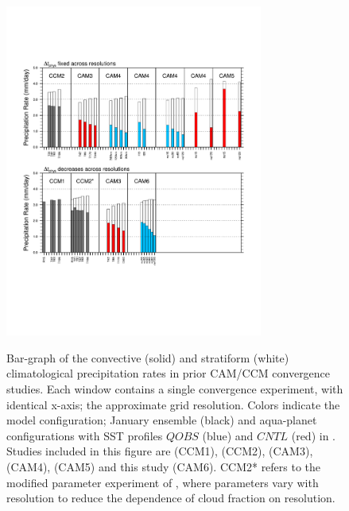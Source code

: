 \documentclass[times]{qjrms4}
\begin{document}
\begin{figure}[t]
\begin{center}
\noindent\includegraphics[width=20pc,angle=0]{figs/cam-history.pdf}\\
\end{center}
\caption{Bar-graph of the convective (solid) and stratiform (white) climatological precipitation rates in prior CAM/CCM convergence studies. Each window contains a single convergence experiment, with identical x-axis; the approximate grid resolution. Colors indicate the model configuration; January ensemble (black) and aqua-planet configurations with SST profiles $QOBS$ (blue) and $CNTL$ (red) in \cite{NH2000ASL}. Studies included in this figure are \cite{KW1991JGR} (CCM1), \cite{WETAL1995CD} (CCM2), \cite{W2008TELLUS} (CAM3), \cite{RETAL2013JCLIM,ZetAl2014JCb,HR2017JCLIM} (CAM4), \cite{ZetAl2014JCb} (CAM5) and this study (CAM6). CCM2* refers to the modified parameter experiment of \cite{WETAL1995CD}, where parameters vary with resolution to reduce the dependence of cloud fraction on resolution.}
\label{fig:cam-history}
\end{figure}
\end{document}

